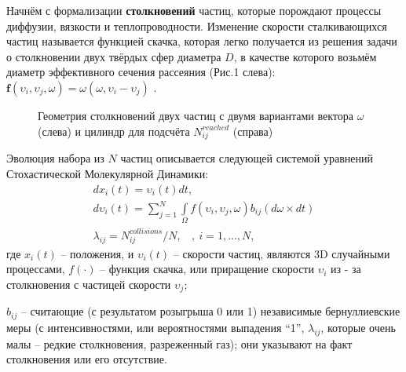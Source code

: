 \documentclass{vzmsthesis}
\begin{document}
Начнём с формализации \textbf{столкновений} частиц, которые порождают процессы диффузии, вязкости и теплопроводности.  Изменение скорости сталкивающихся частиц называется функцией скачка, которая легко получается из решения задачи о столкновении двух твёрдых сфер диаметра $ D $, в качестве которого возьмём диаметр эффективного сечения рассеяния (Рис.1 слева):
$\textbf{f}(\textbf{$\upsilon_{i}$},\textbf{$\upsilon_{j}$},\textbf{$\omega$}) = \textbf{$\omega$} (\textbf{$\omega$},\textbf{$\upsilon_{i}$} - \textbf{$\upsilon_{j}$})$ .\\
\begin{figure}[h!]%
	\caption{Геометрия столкновений двух частиц с двумя вариантами вектора $\omega$ (слева) и цилиндр для подсчёта $N_{ij}^{reached}$ (справа)}
\end{figure}

Эволюция набора из $N$ частиц описывается следующей системой  уравнений Стохастической Молекулярной Динамики:
\begin{eqnarray}\label{SMD}
	 dx_{i}(t) = \upsilon_{i}(t) dt ,\ \ \  \nonumber \\
	 d\upsilon_{i}(t) = \sum\limits_{j=1}^N\int \limits_\Omega f(\upsilon_{i},\upsilon_{j},\omega)b_{ij}(d\omega\times dt) %
	 \\
	 \lambda_{ij} =N_{ij}^{collisions}/N , \ \ \ \ , \ i=1,...,N,\nonumber
  \end{eqnarray}
  где $x_{i}(t)$ -- положения, и $\upsilon_{i}(t)$ -- скорости частиц, являются 3D случайными процессами,
 $f(\cdot)$ -- функция скачка, или приращение скорости $\upsilon_{i}$ из - за столкновения с частицей скорости $\upsilon_{j}$;

 $b_{ij}$ -- считающие (с результатом розыгрыша 0 или 1) независимые бернуллиевские меры (с интенсивностями, или вероятностями выпадения ``1'',  $\lambda_{ij}$, которые  очень малы -- редкие столкновения, разреженный газ); они указывают на факт столкновения или его отсутствие.

 
\end{document}
